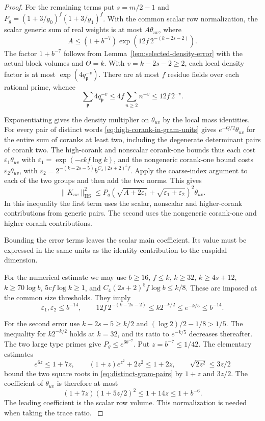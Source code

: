 \begin{proof}

For the remaining terms put \(s=m/2-1\) and
\(P_g=(1+3/g_0)^f(1+3/g_1)^f\). With the common scalar row
normalization, the scalar generic sum of real weights is at most
\(A\theta_{uv}\), where
\[
 A\le(1+b^{-7})\exp(12 f\,2^{-(k-2s-2)}).
\]
The factor \(1+b^{-7}\) follows from Lemma~\ref{lem:selected-density-error} with the actual block volumes and \(\Theta=k\). With \(v=k-2s-2\ge2\), each local density factor is at most
\(\exp(4q_{\mathfrak p}^{-v})\). There are at most \(f\) residue
fields over each rational prime, whence
\[
 \sum_{\mathfrak p}4q_{\mathfrak p}^{-v}
 \le 4f\sum_{n\ge2} n^{-v}\le12f\,2^{-v}.
\]

Exponentiating gives the density multiplier on \(\theta_{uv}\) by the
local mass identities.
For every pair of distinct words \eqref{eq:high-corank-in-gram-units}
gives \(e^{-Q/2}\theta_{uv}\) for the entire sum of coranks at least
two, including the degenerate determinant pairs of corank two.
The high-corank and nonscalar corank-one bounds thus each cost
\(\varepsilon_1\theta_{uv}\) with
\(\varepsilon_1=\exp(-c k f\log k)\), and the nongeneric
corank-one bound costs \(\varepsilon_2\theta_{uv}\), with
\(\varepsilon_2=2^{-(k-2s-5)}b^{C_4(2s+2)^5 f}\).
Apply the coarse-index argument to each of the two groups
and then add the two norms. This gives
\begin{equation}\label{eq:distinct-gram-pairs}
 \|K_{uv}\|_{\mathrm{HS}}^2
 \le P_g\left(\sqrt{A+2\varepsilon_1}
             +\sqrt{\varepsilon_1+\varepsilon_2}\right)^2\theta_{uv}.
\end{equation}
In this inequality the first term uses the scalar, nonscalar and
higher-corank contributions from generic pairs. The second uses
the nongeneric corank-one and higher-corank contributions.


Bounding the error terms leaves the scalar main coefficient. Its value must be expressed in the same units as the identity contribution to the cuspidal dimension.


For the numerical estimate we may use \(b\ge16\), \(f\le k\),
\(k\ge32\), \(k\ge4s+12\), \(k\ge70\log b\),
\(5cf\log k\ge1\), and
\(C_4(2s+2)^5 f\log b\le k/8\). These are imposed at the
common size thresholds. They imply
\[
 \varepsilon_1,\varepsilon_2\le b^{-14},\qquad
 12 f\,2^{-(k-2s-2)}\le k2^{-k/2}\le e^{-k/5}\le b^{-14}.
\]

For the second error use
\(k-2s-5\ge k/2\) and \((\log 2)/2-1/8>1/5\).
The inequality for \(k2^{-k/2}\) holds at \(k=32\), and
its ratio to \(e^{-k/5}\) decreases thereafter.
The two large type primes give \(P_g\le e^{6b^{-7}}\).
Put \(z=b^{-7}\le1/42\). The elementary estimates
\[
 e^{6z}\le1+7z,\qquad
 (1+z)e^{z^2}+2z^2\le1+2z,\qquad
 \sqrt{2z^2}\le3z/2
\]
bound the two square roots in \eqref{eq:distinct-gram-pairs} by
\(1+z\) and \(3z/2\). The coefficient of \(\theta_{uv}\) is therefore at most
\[
 (1+7z)(1+5z/2)^2\le1+14z\le1+b^{-6}.
\]
The leading coefficient is the scalar row volume. This normalization
is needed when taking the trace ratio. \label{cor:selected-row-gram-6}


\end{proof}
